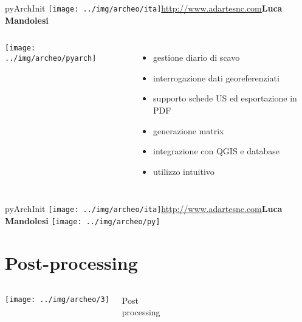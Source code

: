 \documentclass[xcolor=svgnames]{beamer}
\begin{document}

		\begin{frame}{pyArchInit\hfill
			\texttt{[image: ../img/archeo/ita]}}{\url{http://www.adartesnc.com}\hfill \small{\textbf{Luca Mandolesi}}}
			\begin{columns}[c]
					\begin{center}
						\texttt{[image: ../img/archeo/pyarch]}
					\end{center}
					\begin{itemize}
						\item gestione diario di scavo
						\item interrogazione dati georeferenziati
						\item supporto schede US ed esportazione in PDF
						\item generazione matrix
						\item integrazione con QGIS e database
						\item utilizzo intuitivo
					\end{itemize}
			\end{columns}
		\end{frame}


		\begin{frame}{pyArchInit\hfill
			\texttt{[image: ../img/archeo/ita]}}{\url{http://www.adartesnc.com}\hfill \small{\textbf{Luca Mandolesi}}}
			\texttt{[image: ../img/archeo/py]}
		\end{frame}

	\section{Post-processing}

		\begin{frame}
			\begin{columns}[c]
					\begin{center}
						\texttt{[image: ../img/archeo/3]}
					\end{center}
					\Huge Post\\processing
			\end{columns}
		\end{frame}
\end{document}
